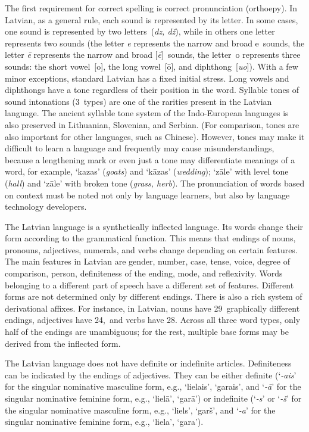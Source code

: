 \begin{multicols}{2}
The first requirement for correct spelling is correct pronunciation (orthoepy).
In Latvian, as a general rule, each sound is represented by its letter.
In some cases, one sound is represented by two letters~(\textit{dz, dž}), while in others one letter represents two sounds (the letter \textit{e} represents the narrow and broad e~sounds, the letter \textit{ē} represents the narrow and broad [\textit{ē}]~sounds, the letter~o represents three sounds: the short vowel~[o], the long vowel~[ō], and diphthong~[\textit{uo}]).
With a few minor exceptions, standard Latvian has a fixed initial stress.
Long vowels and diphthongs have a tone regardless of their position in the word.
Syllable tones of sound intonations (3~types) are one of the rarities present in the Latvian language.
The ancient syllable tone system of the Indo-European languages is also preserved in Lithuanian, Slovenian, and Serbian.
(For comparison, tones are also important for other languages, such as Chinese).
However, tones may make it difficult to learn a language and frequently may cause misunderstandings, because a lengthening mark or even just a tone may differentiate meanings of a word, for example, `kazas' (\textit{goats}) and `kāzas' (\textit{wedding}); `zāle' with level tone (\textit{hall}) and `zāle' with broken tone (\textit{grass, herb}).
The pronunciation of words based on context must be noted not only by language learners, but also by language technology developers.


The Latvian language is a synthetically inflected language.
Its words change their form according to the grammatical function.
This means that endings of nouns, pronouns, adjectives, numerals, and verbs change depending on certain features.
The main features in Latvian are gender, number, case, tense, voice, degree of comparison, person, definiteness of the ending, mode, and reflexivity.
Words belonging to a different part of speech have a different set of features.
Different forms are not determined only by different endings.
There is also a rich system of derivational affixes.
For instance, in Latvian, nouns have 29~graphically different endings, adjectives have 24,~and verbs have 28.
Across all three word types, only half of the endings are unambiguous; for the rest, multiple base forms may be derived from the inflected form.

The Latvian language does not have definite or indefinite articles.
Definiteness can be indicated by the endings of adjectives.
They can be either definite (`\textit{-ais}' for the singular nominative masculine form, e.g., `lielais', `garais', and `\textit{-ā}' for the singular nominative feminine form, e.g., `lielā', `garā') or indefinite (`\textit{-s}' or `\textit{-š}' for the singular nominative masculine form, e.g., `liels', `garš', and `\textit{-a}' for the singular nominative feminine form, e.g., `liela', `gara').


\end{multicols}
